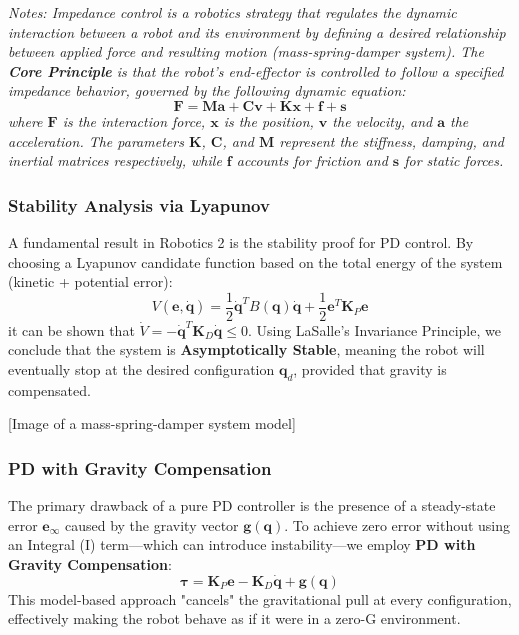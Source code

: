 \begin{framed}
\noindent \textit{Notes: Impedance control is a robotics strategy that regulates 
the dynamic interaction between a robot and its environment by defining a desired relationship between applied 
force and resulting motion (mass-spring-damper system). The \textbf{Core Principle} is that the robot's end-effector is controlled to follow a 
specified impedance behavior, governed by the following dynamic equation:
\begin{equation}
    \bm{F} = \bm{M}\bm{a} + \bm{C}\bm{v} + \bm{K}\bm{x} + \bm{f} + \bm{s}
\end{equation}
where $\bm{F}$ is the interaction force, $\bm{x}$ is the position, $\bm{v}$ the velocity, and $\bm{a}$ the acceleration. 
The parameters $\bm{K}$, $\bm{C}$, and $\bm{M}$ represent the stiffness, damping, and inertial matrices respectively, 
while $\bm{f}$ accounts for friction and $\bm{s}$ for static forces.}
\end{framed}

\subsubsection{Stability Analysis via Lyapunov}
A fundamental result in Robotics 2 is the stability proof for PD control. 
By choosing a Lyapunov candidate function based on the total energy of the system (kinetic + potential error):
\begin{equation}
    V(\bm{e}, \dot{\bm{q}}) = \frac{1}{2}\dot{\bm{q}}^T B(\bm{q})\dot{\bm{q}} + \frac{1}{2}\bm{e}^T \bm{K}_P \bm{e}
\end{equation}
it can be shown that $\dot{V} = -\dot{\bm{q}}^T \bm{K}_D \dot{\bm{q}} \leq 0$. 
Using LaSalle's Invariance Principle, we conclude that the system is \textbf{Asymptotically Stable}, 
meaning the robot will eventually stop at the desired configuration $\bm{q}_d$, provided that gravity is compensated.



[Image of a mass-spring-damper system model]


\subsubsection{PD with Gravity Compensation}
The primary drawback of a pure PD controller is the presence of a steady-state error $\bm{e}_{\infty}$ 
caused by the gravity vector $\bm{g}(\bm{q})$. To achieve zero error without using an Integral (I) term—which can introduce instability—we employ 
\textbf{PD with Gravity Compensation}:
\begin{equation}
    \bm{\tau} = \bm{K}_P \bm{e} - \bm{K}_D \dot{\bm{q}} + \bm{g}(\bm{q})
\end{equation}
This model-based approach "cancels" the gravitational pull at every configuration, effectively making the robot behave as if it were in a zero-G environment.

